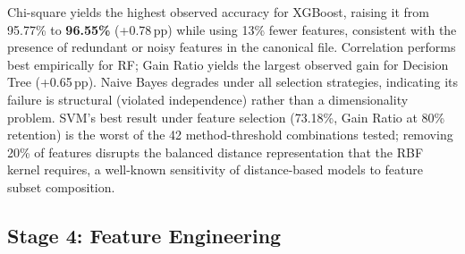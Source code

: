 \documentclass[conference]{IEEEtran}
\begin{document}
\begin{table}[htbp]
\caption{Best Accuracy per Classifier Across All Seven Feature
Selection Methods and Six Retention Thresholds}
\label{tab:fs_best}
\centering
{}
\end{table}

Chi-square yields the highest observed accuracy for XGBoost,
raising it from 95.77\% to \textbf{96.55\%} (+0.78\,pp)
while using 13\% fewer features, consistent with the presence
of redundant or noisy features in the canonical file.
Correlation performs best empirically for RF; Gain Ratio
yields the largest observed gain for Decision Tree (+0.65\,pp). Naive
Bayes degrades under all selection strategies, indicating its
failure is structural (violated independence) rather than a
dimensionality problem. SVM's best result under feature selection
(73.18\%, Gain Ratio at 80\% retention) is the worst of the 42
method-threshold combinations tested; removing 20\% of features
disrupts the balanced distance representation that the RBF kernel
requires, a well-known sensitivity of distance-based models to
feature subset composition.

\subsection{Stage 4: Feature Engineering}
\end{document}
